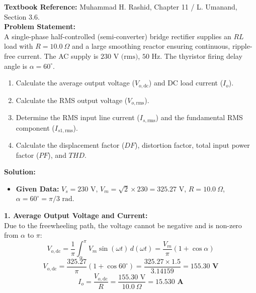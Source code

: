 \documentclass[10pt,a4paper]{article}
\begin{document}
\begin{tcolorbox}[qbox, title={Question 4: Single-Phase Semi-converter with RL Load --- Harmonics \& Power Factor}]
\textbf{Textbook Reference:} Muhammad H. Rashid, Chapter 11 / L. Umanand, Section 3.6.\\[1mm]
\textbf{Problem Statement:}\\
A single-phase half-controlled (semi-converter) bridge rectifier supplies an $RL$ load with $R = 10.0\ \Omega$ and a large smoothing reactor ensuring continuous, ripple-free current. The AC supply is $230\text{ V (rms)}$, $50\text{ Hz}$. The thyristor firing delay angle is $\alpha = 60^\circ$.
\begin{enumerate}
  \item Calculate the average output voltage ($V_{o,\text{dc}}$) and DC load current ($I_o$).
  \item Calculate the RMS output voltage ($V_{o,\text{rms}}$).
  \item Determine the RMS input line current ($I_{s,\text{rms}}$) and the fundamental RMS component ($I_{s1,\text{rms}}$).
  \item Calculate the displacement factor ($DF$), distortion factor, total input power factor ($PF$), and $THD$.
\end{enumerate}
\end{tcolorbox}

\vspace{1mm}
\noindent\textbf{\textcolor{accentteal}{Solution:}}
\begin{itemize}
  \item \textbf{Given Data:} $V_s = 230\text{ V}$, $V_m = \sqrt{2} \times 230 = 325.27\text{ V}$, $R = 10.0\ \Omega$, $\alpha = 60^\circ = \pi/3\text{ rad}$.
\end{itemize}

\noindent\textbf{1. Average Output Voltage and Current:}\\
Due to the freewheeling path, the voltage cannot be negative and is non-zero from $\alpha$ to $\pi$:
\[
V_{o,\text{dc}} = \frac{1}{\pi}\int_{\alpha}^{\pi} V_m \sin(\omega t)\, d(\omega t) = \frac{V_m}{\pi}(1 + \cos\alpha)
\]
\[
V_{o,\text{dc}} = \frac{325.27}{\pi}(1 + \cos 60^\circ) = \frac{325.27 \times 1.5}{3.14159} = \mathbf{155.30\text{ V}}
\]
\[
I_o = \frac{V_{o,\text{dc}}}{R} = \frac{155.30\text{ V}}{10.0\ \Omega} = \mathbf{15.530\text{ A}}
\]
\end{document}
